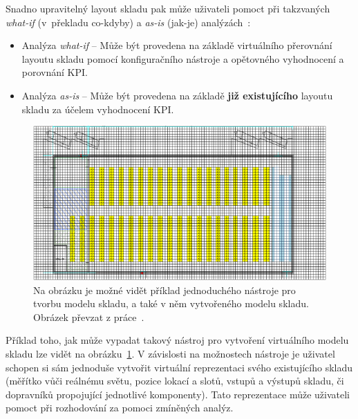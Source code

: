 Snadno upravitelný layout skladu pak může uživateli pomoct při takzvaných \emph{what-if} (v~překladu co-kdyby) a \emph{as-is} (jak-je) analýzách~\cite{slapSeacomp}:

\begin{itemize}
    \item Analýza \emph{what-if} -- Může být provedena na základě virtuálního přerovnání layoutu skladu pomocí konfiguračního nástroje a opětovného vyhodnocení a porovnání KPI.
    \item Analýza \emph{as-is} -- Může být provedena na základě \textbf{již existujícího} layoutu skladu za účelem vyhodnocení KPI.
\end{itemize}

\begin{figure}[t]
    \centering
    \includegraphics[width=0.99\linewidth]{figures/slap_ea/DesignTool.png}
    \caption{Na obrázku je možné vidět příklad jednoduchého nástroje pro tvorbu modelu skladu, a také v něm vytvořeného modelu skladu. Obrázek převzat z práce~\cite{slapSeacomp}.}
    \label{fig:slapDesignTool}
\end{figure}

Příklad toho, jak může vypadat takový nástroj pro vytvoření virtuálního modelu skladu lze vidět na obrázku~\ref{fig:slapDesignTool}. V závislosti na možnostech nástroje je uživatel schopen si sám jednoduše vytvořit virtuální reprezentaci svého existujícího skladu (měřítko vůči reálnému světu, pozice lokací a slotů, vstupů a výstupů skladu, či dopravníků propojující jednotlivé komponenty). Tato reprezentace může uživateli pomoct při rozhodování za pomoci zmíněných analýz.

